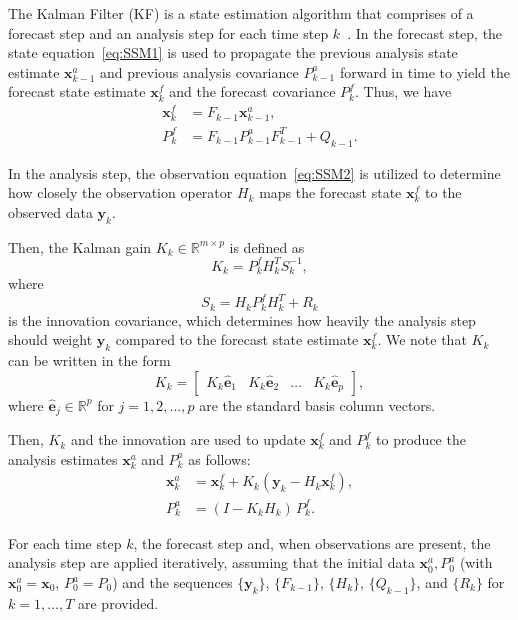 \documentclass[11p]{elsarticle}
\numberwithin{equation}{section}
\newcommand{\vect}[1]{\ensuremath{\bm{#1}}}
\begin{document}
The Kalman Filter (KF) is a state estimation algorithm that comprises of a forecast step and an analysis step for each time step $k$~\cite{Kalman1960}. In the forecast step, the state equation~\eqref{eq:SSM1} is used to propagate the previous analysis state estimate $\vect{x}_{k-1}^a$ and previous analysis covariance $P_{k-1}^a$ forward in time to yield the forecast state estimate $\vect{x}_{k}^f$ and the forecast covariance $P_{k}^f$. Thus, we have
\begin{align}
\vect{x}_k^f &= F_{k-1} \vect{x}_{k-1}^a,    \label{alg:KF_forecast_1} \\
P_k^f &= F_{k-1} P_{k-1}^a F_{k-1}^T + Q_{k-1}. \label{alg:KF_forecast_2}
\end{align}

In the analysis step, the observation equation~\eqref{eq:SSM2} is utilized to determine how closely the observation operator $H_k$ maps the forecast state $\vect{x}_{k}^f$ to the observed data $\vect{y}_k$. 


Then, the Kalman gain $K_k \in \mathbb{R}^{m \times p}$ is defined as
\begin{equation}
    K_k = P_k^f H_k^T S_k^{-1},
\end{equation}
where
\begin{equation}
    S_k = H_k P_k^f H_k^T + R_k
\end{equation}
is the innovation covariance, which determines how heavily the analysis step should weight $\vect{y}_k$ compared to the forecast state estimate $\vect{x}_k^f$.
We note that $K_k$ can be written in the form
\begin{equation}
K_k = \begin{bmatrix}
        K_k\hat{\vect{e}}_1 & K_k\hat{\vect{e}}_2 & \dots  & K_k\hat{\vect{e}}_p
    \end{bmatrix},
\end{equation}
where $\hat{\vect{e}}_j \in \mathbb{R}^p$ for $j=1,2,...,p$ are the standard basis column vectors.

Then, $K_k$ and the innovation are used to update $\vect{x}_{k}^f$ and $P_{k}^f$ to produce the analysis estimates $\vect{x}_{k}^a$ and $P_{k}^a$ as follows:
\begin{align}
\vect{x}_k^a &= \vect{x}_k^f + K_k (\vect{y}_k - H_k \vect{x}_k^f), \label{alg:KF_analysis_1} \\
P_k^a &= (I - K_k H_k)\, P_k^f. \label{alg:KF_analysis_2}
\end{align}

For each time step $k$, the forecast step and, when observations are present, the analysis step are applied iteratively, assuming that the initial data
$\vect{x}_0^a, P_0^a$ (with $\vect{x}_0^a = \vect{x}_0$, $P_0^a = P_0$) and the
sequences $\{\vect{y}_k\}$, $\{F_{k-1}\}$, $\{H_k\}$, $\{Q_{k-1}\}$, and
$\{R_k\}$ for $k = 1,\dots,T$ are provided.
\end{document}
